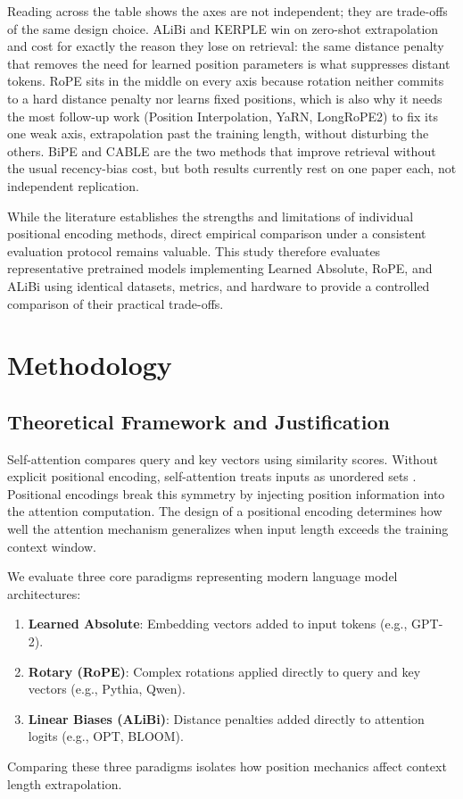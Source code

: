 \documentclass[conference]{IEEEtran}
\begin{document}
Reading across the table shows the axes are not independent; they are trade-offs of the same design choice. ALiBi and KERPLE win on zero-shot extrapolation and cost for exactly the reason they lose on retrieval: the same distance penalty that removes the need for learned position parameters is what suppresses distant tokens. RoPE sits in the middle on every axis because rotation neither commits to a hard distance penalty nor learns fixed positions, which is also why it needs the most follow-up work (Position Interpolation, YaRN, LongRoPE2) to fix its one weak axis, extrapolation past the training length, without disturbing the others. BiPE and CABLE are the two methods that improve retrieval without the usual recency-bias cost, but both results currently rest on one paper each, not independent replication.

While the literature establishes the strengths and limitations of individual positional encoding methods, direct empirical comparison under a consistent evaluation protocol remains valuable. This study therefore evaluates representative pretrained models implementing Learned Absolute, RoPE, and ALiBi using identical datasets, metrics, and hardware to provide a controlled comparison of their practical trade-offs.

\section{Methodology}
\label{sec:methodology}

\subsection{Theoretical Framework and Justification}

Self-attention compares query and key vectors using similarity scores. Without explicit positional encoding, self-attention treats inputs as unordered sets \cite{vaswani2017}. Positional encodings break this symmetry by injecting position information into the attention computation. The design of a positional encoding determines how well the attention mechanism generalizes when input length exceeds the training context window.

We evaluate three core paradigms representing modern language model architectures:
\begin{enumerate}
\item \textbf{Learned Absolute}: Embedding vectors added to input tokens (e.g., GPT-2).
\item \textbf{Rotary (RoPE)}: Complex rotations applied directly to query and key vectors \cite{su2024roformer} (e.g., Pythia, Qwen).
\item \textbf{Linear Biases (ALiBi)}: Distance penalties added directly to attention logits \cite{press2022} (e.g., OPT, BLOOM).
\end{enumerate}
Comparing these three paradigms isolates how position mechanics affect context length extrapolation.
\end{document}
